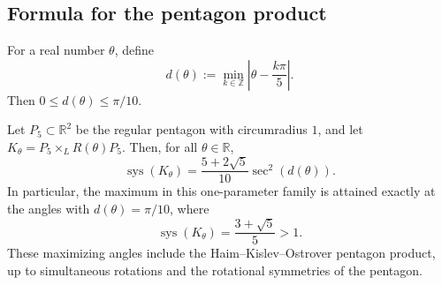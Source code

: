 \subsection{Formula for the pentagon product}
\label{subsec:rotated-regular-polygons-formula-for-the-pentagon-product}

For a real number \(\theta\), define
\[
  d(\theta)
  :=
  \min_{k\in\mathbb{Z}}\left|\theta-\frac{k\pi}{5}\right|.
\]
Then \(0\le d(\theta)\le\pi/10\).

\begin{theorem}
\label{thm:rotated-pentagon-product-formula}
Let \(P_5\subset\mathbb{R}^2\) be the regular pentagon with circumradius \(1\),
and let \(K_\theta=P_5\times_L R(\theta)P_5\). Then, for all
\(\theta\in\mathbb{R}\),
\[
  \operatorname{sys}(K_\theta)
  =
  \frac{5+2\sqrt{5}}{10}\sec^2(d(\theta)).
\]
In particular, the maximum in this one-parameter family is attained exactly at
the angles with \(d(\theta)=\pi/10\), where
\[
  \operatorname{sys}(K_\theta)=\frac{3+\sqrt{5}}{5}>1.
\]
These maximizing angles include the Haim--Kislev--Ostrover pentagon product,
up to simultaneous rotations and the rotational symmetries of the pentagon.
\end{theorem}

